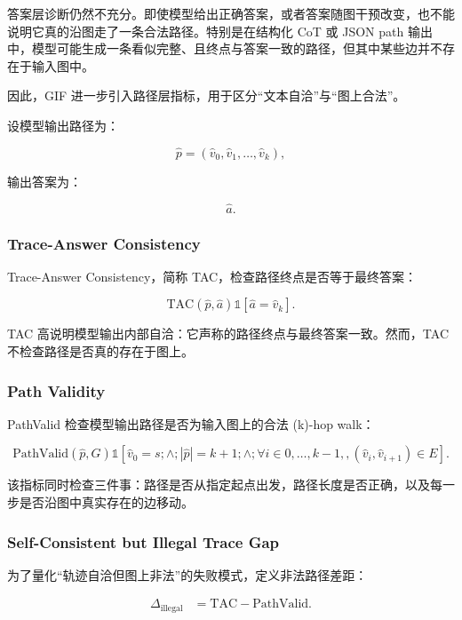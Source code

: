 \documentclass[
  11pt,
]{article}
\begin{document}
答案层诊断仍然不充分。即使模型给出正确答案，或者答案随图干预改变，也不能说明它真的沿图走了一条合法路径。特别是在结构化
CoT 或 JSON path
输出中，模型可能生成一条看似完整、且终点与答案一致的路径，但其中某些边并不存在于输入图中。

因此，GIF 进一步引入路径层指标，用于区分``文本自洽''与``图上合法''。

设模型输出路径为：

\[
\hat{p}=(\hat{v}_0,\hat{v}_1,\dots,\hat{v}_k),  
\]

输出答案为：

\[
\hat{a}.  
\]

\subsubsection{Trace-Answer Consistency}\label{trace-answer-consistency}

Trace-Answer Consistency，简称 TAC，检查路径终点是否等于最终答案：

\[
\mathrm{TAC}(\hat{p},\hat{a})
\mathbb{1}  
\left[  
\hat{a}=\hat{v}_k  
\right].  
\]

TAC 高说明模型输出内部自洽：它声称的路径终点与最终答案一致。然而，TAC
不检查路径是否真的存在于图上。

\subsubsection{Path Validity}\label{path-validity}

PathValid 检查模型输出路径是否为输入图上的合法 (k)-hop walk：

\[
\mathrm{PathValid}(\hat{p},G)
\mathbb{1}  
\left[  
\hat{v}_0=s  
;\wedge;  
|\hat{p}|=k+1  
;\wedge;  
\forall i\in{0,\dots,k-1},,  
(\hat{v}_i,\hat{v}_{i+1})\in E  
\right].  
\]

该指标同时检查三件事：路径是否从指定起点出发，路径长度是否正确，以及每一步是否沿图中真实存在的边移动。

\subsubsection{Self-Consistent but Illegal Trace
Gap}\label{self-consistent-but-illegal-trace-gap}

为了量化``轨迹自洽但图上非法''的失败模式，定义非法路径差距：

\[
\begin{aligned}
\Delta_{\text{illegal}}
&= \mathrm{TAC} - \mathrm{PathValid}.
\end{aligned}
\]
\end{document}

